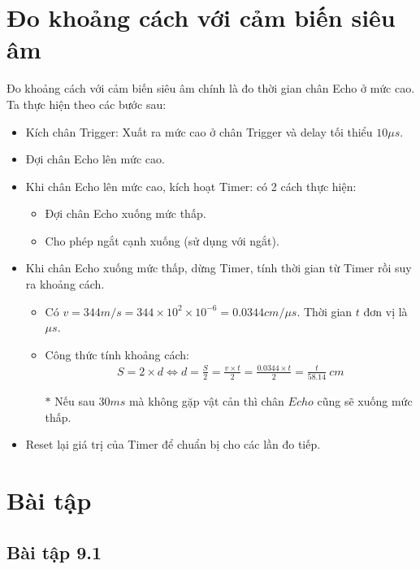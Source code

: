 \section{Đo khoảng cách với cảm biến siêu âm}
Đo khoảng cách với cảm biến siêu âm chính là đo thời gian chân Echo ở mức cao. Ta thực hiện theo các bước sau:
\begin{itemize}
\item Kích chân Trigger: Xuất ra mức cao ở chân Trigger và delay tối thiểu $10\mu s$.
\item Đợi chân Echo lên mức cao.
\item Khi chân Echo lên mức cao, kích hoạt Timer: có 2 cách thực hiện:
\begin{itemize}
\item Đợi chân Echo xuống mức thấp.
\item Cho phép ngắt cạnh xuống (sử dụng với ngắt).
\end{itemize}
\item Khi chân Echo xuống mức thấp, dừng Timer, tính thời gian từ Timer rồi suy ra khoảng cách.
\begin{itemize}
\item Có $v = 344 m/s = 344 \times 10^2 \times 10^{-6} = 0.0344 cm/\mu s$. Thời gian $t$ đơn vị là $\mu s$.
\item Công thức tính khoảng cách:
\begin{align*}
S = 2 \times d \Longleftrightarrow d = \frac{S}{2} = \frac{v \times t}{2} = \frac{0.0344 \times t}{2} = \frac{t}{58.14} ~cm
\end{align*}
\item[$\ast$] Nếu sau $30ms$ mà không gặp vật cản thì chân $Echo$ cũng sẽ xuống mức thấp.
\end{itemize}
\item Reset lại giá trị của Timer để chuẩn bị cho các lần đo tiếp.
\end{itemize}
\section{Bài tập}
\subsection{Bài tập 9.1}
